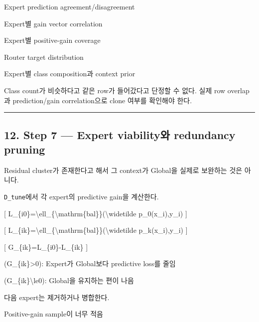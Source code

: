 \par\noindent \textbullet\enspace Expert prediction agreement/\allowbreak{}disagreement


\par\noindent \textbullet\enspace Expert별 gain vector correlation


\par\noindent \textbullet\enspace Expert별 positive-gain coverage


\par\noindent \textbullet\enspace Router target distribution


\par\noindent \textbullet\enspace Expert별 class composition과 context prior


Class count가 비슷하다고 같은 row가 들어갔다고 단정할 수 없다. 실제 row overlap과 prediction/\allowbreak{}gain correlation으로 clone 여부를 확인해야 한다.


\medskip\hrule\medskip
\subsection{12. Step 7 — Expert viability와 redundancy pruning}
Residual cluster가 존재한다고 해서 그 context가 Global을 실제로 보완하는 것은 아니다.

\texttt{D\_\allowbreak{}\allowbreak{}tune}에서 각 expert의 predictive gain을 계산한다.

[ L\_\allowbreak{}\{i0\}=\allowbreak{}\textbackslash{}ell\_\allowbreak{}\{\textbackslash{}mathrm\{bal\}\}(\textbackslash{}widetilde p\_\allowbreak{}0(x\_\allowbreak{}i),y\_\allowbreak{}i) ]

[ L\_\allowbreak{}\{ik\}=\allowbreak{}\textbackslash{}ell\_\allowbreak{}\{\textbackslash{}mathrm\{bal\}\}(\textbackslash{}widetilde p\_\allowbreak{}k(x\_\allowbreak{}i),y\_\allowbreak{}i) ]

[ G\_\allowbreak{}\{ik\}=\allowbreak{}L\_\allowbreak{}\{i0\}-L\_\allowbreak{}\{ik\} ]

\par\noindent \textbullet\enspace (G\_\allowbreak{}\{ik\}>0): Expert가 Global보다 predictive loss를 줄임


\par\noindent \textbullet\enspace (G\_\allowbreak{}\{ik\}\textbackslash{}le0): Global을 유지하는 편이 나음


다음 expert는 제거하거나 병합한다.

\par\noindent \textbullet\enspace Positive-gain sample이 너무 적음


